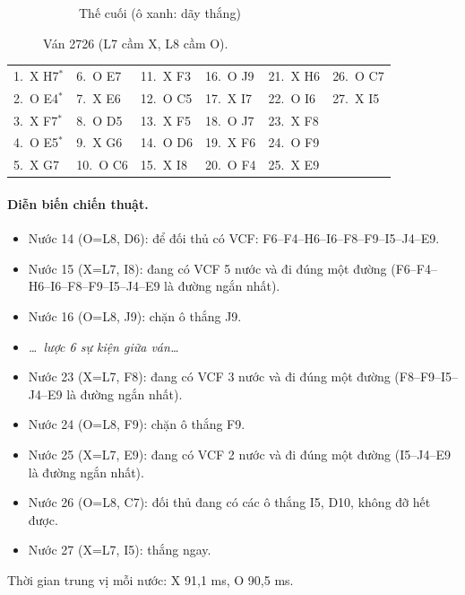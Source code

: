\begin{figure}[H]
\begin{subfigure}[t]{.48\linewidth}
    \caption{Thế cuối (ô xanh: dãy thắng)}
  \end{subfigure}
  \caption{Ván 2726 (L7 cầm X, L8 cầm O).}
  \label{fig:cs-van-28}
\end{figure}
{\footnotesize\linespread{1}\selectfont
\noindent\begin{tabularx}{\linewidth}{*{6}{X}}
\toprule
1.~X H7$^\ast$ & 6.~O E7 & 11.~X F3 & 16.~O J9 & 21.~X H6 & 26.~O C7 \\
2.~O E4$^\ast$ & 7.~X E6 & 12.~O C5 & 17.~X I7 & 22.~O I6 & 27.~X I5 \\
3.~X F7$^\ast$ & 8.~O D5 & 13.~X F5 & 18.~O J7 & 23.~X F8 &  \\
4.~O E5$^\ast$ & 9.~X G6 & 14.~O D6 & 19.~X F6 & 24.~O F9 &  \\
5.~X G7 & 10.~O C6 & 15.~X I8 & 20.~O F4 & 25.~X E9 &  \\
\bottomrule
\end{tabularx}\par}
\paragraph{Diễn biến chiến thuật.}
\begin{itemize}\footnotesize\linespread{1.1}\selectfont
\setlength{\itemsep}{0pt}
  \item Nước 14 (O=L8, D6): để đối thủ có VCF: F6--F4--H6--I6--F8--F9--I5--J4--E9.
  \item Nước 15 (X=L7, I8): đang có VCF 5 nước và đi đúng một đường (F6--F4--H6--I6--F8--F9--I5--J4--E9 là đường ngắn nhất).
  \item Nước 16 (O=L8, J9): chặn ô thắng J9.
  \item[] \emph{\dots\ lược 6 sự kiện giữa ván\dots}
  \item Nước 23 (X=L7, F8): đang có VCF 3 nước và đi đúng một đường (F8--F9--I5--J4--E9 là đường ngắn nhất).
  \item Nước 24 (O=L8, F9): chặn ô thắng F9.
  \item Nước 25 (X=L7, E9): đang có VCF 2 nước và đi đúng một đường (I5--J4--E9 là đường ngắn nhất).
  \item Nước 26 (O=L8, C7): đối thủ đang có các ô thắng I5, D10, không đỡ hết được.
  \item Nước 27 (X=L7, I5): thắng ngay.
\end{itemize}
Thời gian trung vị mỗi nước: X 91,1 ms, O 90,5 ms.
\clearpage

